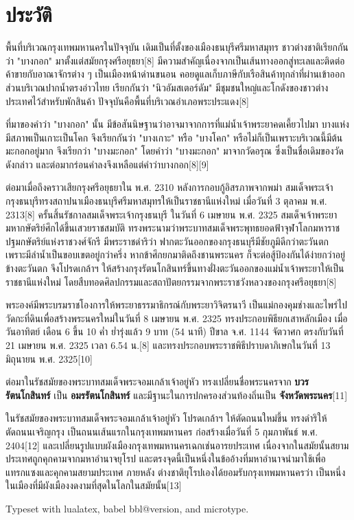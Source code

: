 \documentclass[twocolumn]{article}
\begin{document}
\section{ประวัติ}

พื้นที่บริเวณกรุงเทพมหานครในปัจจุบัน เดิมเป็นที่ตั้งของเมืองธนบุรีศรีมหาสมุทร ชาวต่างชาติเรียกกันว่า "บางกอก" มาตั้งแต่สมัยกรุงศรีอยุธยา[8] มีความสำคัญเนื่องจากเป็นเส้นทางออกสู่ทะเลและติดต่อค้าขายกับอาณาจักรต่าง ๆ เป็นเมืองหน้าด่านขนอน คอยดูแลเก็บภาษีกับเรือสินค้าทุกลำที่ผ่านเข้าออก ส่วนบริเวณปากน้ำตรงอ่าวไทย เรียกกันว่า "นิวอัมสเตอร์ดัม" มีชุมชนใหญ่และโกดังของชาวต่างประเทศไว้สำหรับพักสินค้า ปัจจุบันคือพื้นที่บริเวณอำเภอพระประแดง[8]

ที่มาของคำว่า "บางกอก" นั้น มีข้อสันนิษฐานว่าอาจมาจากการที่แม่น้ำเจ้าพระยาคดเคี้ยวไปมา บางแห่งมีสภาพเป็นเกาะเป็นโคก จึงเรียกกันว่า "บางเกาะ" หรือ "บางโคก" หรือไม่ก็เป็นเพราะบริเวณนี้มีต้นมะกอกอยู่มาก จึงเรียกว่า "บางมะกอก" โดยคำว่า "บางมะกอก" มาจากวัดอรุณ ซึ่งเป็นชื่อเดิมของวัดดังกล่าว และต่อมากร่อนคำลงจึงเหลือแต่คำว่าบางกอก[8][9]

ต่อมาเมื่อถึงคราวเสียกรุงศรีอยุธยาใน พ.ศ. 2310 หลังการกอบกู้อิสรภาพจากพม่า สมเด็จพระเจ้ากรุงธนบุรีทรงสถาปนาเมืองธนบุรีศรีมหาสมุทรให้เป็นราชธานีแห่งใหม่ เมื่อวันที่ 3 ตุลาคม พ.ศ. 2313[8] ครั้นสิ้นรัชกาลสมเด็จพระเจ้ากรุงธนบุรี ในวันที่ 6 เมษายน พ.ศ. 2325 สมเด็จเจ้าพระยามหากษัตริย์ศึกได้ขึ้นเสวยราชสมบัติ ทรงพระนามว่าพระบาทสมเด็จพระพุทธยอดฟ้าจุฬาโลกมหาราช ปฐมกษัตริย์แห่งราชวงศ์จักรี มีพระราชดำริว่า ฟากตะวันออกของกรุงธนบุรีมีชัยภูมิดีกว่าตะวันตก เพราะมีลำน้ำเป็นขอบเขตอยู่กว่าครึ่ง หากข้าศึกยกมาติดถึงชานพระนคร ก็จะต่อสู้ป้องกันได้ง่ายกว่าอยู่ข้างตะวันตก จึงโปรดเกล้าฯ ให้สร้างกรุงรัตนโกสินทร์ขึ้นทางฝั่งตะวันออกของแม่น้ำเจ้าพระยาให้เป็นราชธานีแห่งใหม่ โดยสืบทอดศิลปกรรมและสถาปัตยกรรมจากพระราชวังหลวงของกรุงศรีอยุธยา[8]

พระองค์มีพระบรมราชโองการให้พระยาธรรมาธิกรณ์กับพระยาวิจิตรนาวี เป็นแม่กองคุมช่างและไพร่ไปวัดกะที่ดินเพื่อสร้างพระนครใหม่ในวันที่ 8 เมษายน พ.ศ. 2325 ทรงประกอบพิธียกเสาหลักเมือง เมื่อวันอาทิตย์ เดือน 6 ขึ้น 10 ค่ำ ย่ำรุ่งแล้ว 9 บาท (54 นาที) ปีขาล จ.ศ. 1144 จัตวาศก ตรงกับวันที่ 21 เมษายน พ.ศ. 2325 เวลา 6.54 น.[8] และทรงประกอบพระราชพิธีปราบดาภิเษกในวันที่ 13 มิถุนายน พ.ศ. 2325[10]

ต่อมาในรัชสมัยของพระบาทสมเด็จพระจอมเกล้าเจ้าอยู่หัว ทรงเปลี่ยนชื่อพระนครจาก \textbf{บวรรัตนโกสินทร์} เป็น \textbf{อมรรัตนโกสินทร์} และมีฐานะในการปกครองส่วนท้องถิ่นเป็น \textbf{จังหวัดพระนคร}[11]

ในรัชสมัยของพระบาทสมเด็จพระจอมเกล้าเจ้าอยู่หัว โปรดเกล้าฯ ให้ตัดถนนใหม่ขึ้น ทรงดำริให้ตัดถนนเจริญกรุง เป็นถนนเส้นแรกในกรุงเทพมหานคร ก่อสร้างเมื่อวันที่ 5 กุมภาพันธ์ พ.ศ. 2404[12] และเปลี่ยนรูปแบบผังเมืองกรุงเทพมหานครเฉกเช่นอารยประเทศ เนื่องจากในสมัยนั้นสยามประเทศถูกคุกคามจากมหาอำนาจยุโรป และตรงจุดนี้เป็นหนึ่งในข้ออ้างที่มหาอำนาจนำมาใช้เพื่อแทรกแซงและคุกคามสยามประเทศ ภายหลัง ต่างชาติยุโรปเองได้ยอมรับกรุงเทพมหานครว่า เป็นหนึ่งในเมืองที่มีผังเมืองงดงามที่สุดในโลกในสมัยนั้น[13]

\bigskip

Typeset with lualatex, babel \csname bbl@version\endcsname, and 
microtype.
\end{document}
